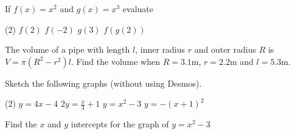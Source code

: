 \begin{Exercise}[title={Functions},label=ex12]

\Question If $f (x) =x^{2}$ and $g (x) =x^{3}$ evaluate
\begin{tasks}(2)
	\task 	 $f (2)$%
	\task    $f ( -2)$%
	\task 	 $g (3)$%
	\task    $f(g ( 2))$%
\end{tasks}

\Question The volume of a pipe with length $l$, inner radius $r$ and outer radius $R$ is $V =\pi  \left (R^{2} -r^{2}\right ) l\text{.}$ Find the volume when $R =3.1 \mbox{m}$, $r =2.2 \mbox{m}$ and $l =5.3 \mbox{m}\text{.}$%

\Question Sketch the following graphs (without using Desmos).
\begin{tasks}(2)
	\task 	 $y=4x-4$
	\task    $2y=\frac{x}{3}+1$	
	\task 	 $y =x^{2} -3$ 
	\task    $y =-(x+1)^{2}$ 
\end{tasks}

\Question Find the $x$ and $y$ intercepts for the graph of $y =x^{2} -3$%


\end{Exercise}

